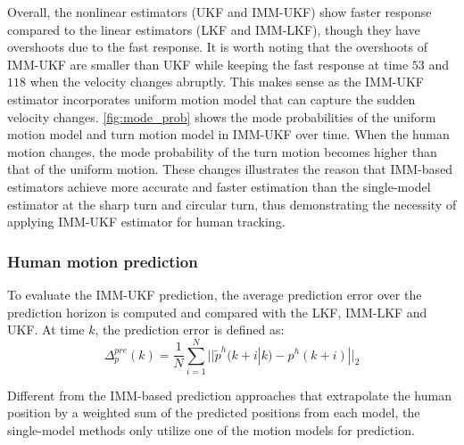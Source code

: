 \documentclass[letterpaper, 10 pt, conference]{ieeeconf}
\begin{document}
	Overall, the nonlinear estimators (UKF and IMM-UKF) show faster response compared to the linear estimators (LKF and IMM-LKF), though they have overshoots due to the fast response. 
	It is worth noting that the overshoots of IMM-UKF are smaller than UKF while keeping the fast response at time $53$ and $118$ when the velocity changes abruptly.    
	This makes sense as the IMM-UKF estimator incorporates uniform motion model that can capture the sudden velocity changes.
	\cref{fig:mode_prob} shows the mode probabilities of the uniform motion model and turn motion model in IMM-UKF over time.
	When the human motion changes, the mode probability of the turn motion becomes higher than that of the uniform motion. 
	These changes illustrates the reason that IMM-based estimators achieve more accurate and faster estimation than the single-model estimator at the sharp turn and circular turn, thus demonstrating the necessity of applying IMM-UKF estimator for human tracking.
	
	\subsubsection{Human motion prediction}\label{subsubsec:motion_pred}
	To evaluate the IMM-UKF prediction, the average prediction error over the prediction horizon is computed and compared with the LKF, IMM-LKF and UKF. 
	At time $k$, the prediction error is defined as:
	\begin{equation}
	\Delta^{pre}_p(k)=\frac{1}{N}\sum\limits_{i=1}^{N}||\tilde{p}^h(k+i|k)-p^h(k+i)||_2\label{eqn:pred_err}
	\end{equation}
	
	Different from the IMM-based prediction approaches that extrapolate the human position by a weighted sum of the predicted positions from each model, the single-model methods only utilize one of the motion models for prediction.
	
\end{document}
